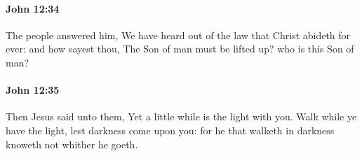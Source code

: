 		\paragraph{John 12:34} %
			\label{JOHN-12-34}

			The people answered him, We have heard out of the law that Christ abideth for ever: and how sayest thou, The Son of man must be lifted up? who is this Son of man?

			\begin{framed}
				\scriptsize
				\begin{compactdesc}
					\item[SBLG] 
				\end{compactdesc}
			\end{framed}

		\paragraph{John 12:35} %
			\label{JOHN-12-35}

			Then Jesus said unto them, Yet a little while is the light with you. Walk while ye have the light, lest darkness come upon you: for he that walketh in darkness knoweth not whither he goeth.

